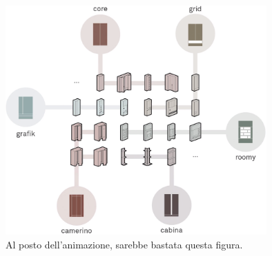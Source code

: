 \begin{figure}[H]
    \centering
    \includegraphics[width=10cm,keepaspectratio]{sez/FreedHome/img/video.png}
    \caption{Al posto dell'animazione, sarebbe bastata questa figura.}
    \label{fig:Animazione}
\end{figure}